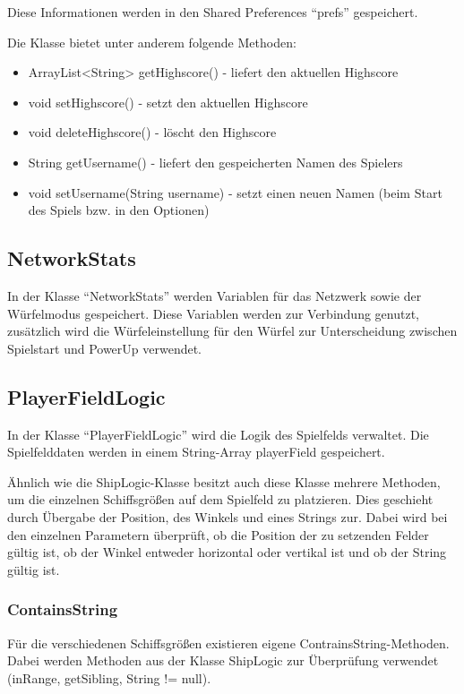 \documentclass[11pt]{article} %
\begin{document}
Diese Informationen werden in den Shared Preferences \enquote{prefs} gespeichert. 

Die Klasse bietet unter anderem folgende Methoden:
\begin{itemize}
\item ArrayList<String> getHighscore() - liefert den aktuellen Highscore
\item void setHighscore() - setzt den aktuellen Highscore
\item void deleteHighscore() - löscht den Highscore

\item String getUsername() - liefert den gespeicherten Namen des Spielers
\item void setUsername(String username) - setzt einen neuen Namen (beim Start des Spiels bzw. in den Optionen)
\end{itemize}

\subsection{NetworkStats}
In der Klasse \enquote{NetworkStats} werden Variablen für das Netzwerk sowie der Würfelmodus gespeichert. Diese Variablen werden zur Verbindung genutzt, zusätzlich wird die Würfeleinstellung für den Würfel zur Unterscheidung zwischen Spielstart und PowerUp verwendet.

\subsection{PlayerFieldLogic}
In der Klasse \enquote{PlayerFieldLogic} wird die Logik des Spielfelds verwaltet. Die Spielfelddaten werden in einem String-Array playerField gespeichert.

Ähnlich wie die ShipLogic-Klasse besitzt auch diese Klasse mehrere Methoden, um die einzelnen Schiffsgrößen auf dem Spielfeld zu platzieren. Dies geschieht durch Übergabe der Position, des Winkels und eines Strings zur. Dabei wird bei den einzelnen Parametern überprüft, ob die Position der zu setzenden Felder gültig ist, ob der Winkel entweder horizontal oder vertikal ist und ob der String gültig ist.

\subsubsection{ContainsString}
Für die verschiedenen Schiffsgrößen existieren eigene ContrainsString-Methoden. Dabei werden Methoden aus der Klasse ShipLogic zur Überprüfung verwendet (inRange, getSibling, String != null).
\end{document}
